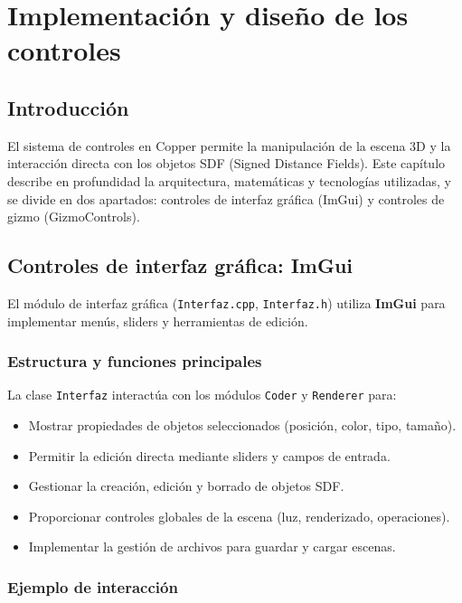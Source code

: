 \chapter{Implementación y diseño de los controles}

\section{Introducción}

El sistema de controles en Copper permite la manipulación de la escena 3D y la
interacción directa con los objetos SDF (Signed Distance Fields). Este capítulo
describe en profundidad la arquitectura, matemáticas y tecnologías utilizadas,
y se divide en dos apartados: controles de interfaz gráfica (ImGui) y controles
de gizmo (GizmoControls).

\section{Controles de interfaz gráfica: ImGui}

El módulo de interfaz gráfica (\texttt{Interfaz.cpp}, \texttt{Interfaz.h})
utiliza \textbf{ImGui} para implementar menús, sliders y herramientas de
edición.

\subsection{Estructura y funciones principales}

La clase \texttt{Interfaz} interactúa con los módulos \texttt{Coder} y
\texttt{Renderer} para:
\begin{itemize}
    \item Mostrar propiedades de objetos seleccionados (posición, color, tipo, tamaño).
    \item Permitir la edición directa mediante sliders y campos de entrada.
    \item Gestionar la creación, edición y borrado de objetos SDF.
    \item Proporcionar controles globales de la escena (luz, renderizado, operaciones).
    \item Implementar la gestión de archivos para guardar y cargar escenas.
\end{itemize}

\subsection{Ejemplo de interacción}

